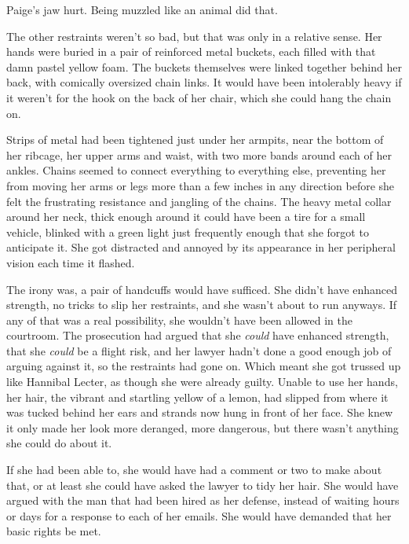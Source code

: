 





Paige's jaw hurt.  Being muzzled like an animal did that.



The other restraints weren't so bad, but that was only in a relative sense.  Her hands were buried in a pair of reinforced metal buckets, each filled with that damn pastel yellow foam.  The buckets themselves were linked together behind her back, with comically oversized chain links.  It would have been intolerably heavy if it weren't for the hook on the back of her chair, which she could hang the chain on.



Strips of metal had been tightened just under her armpits, near the bottom of her ribcage, her upper arms and waist, with two more bands around each of her ankles.  Chains seemed to connect everything to everything else, preventing her from moving her arms or legs more than a few inches in any direction before she felt the frustrating resistance and jangling of the chains.  The heavy metal collar around her neck, thick enough around it could have been a tire for a small vehicle, blinked with a green light just frequently enough that she forgot to anticipate it.  She got distracted and annoyed by its appearance in her peripheral vision each time it flashed.



The irony was, a pair of handcuffs would have sufficed.  She didn't have enhanced strength, no tricks to slip her restraints, and she wasn't about to run anyways.  If any of that was a real possibility, she wouldn't have been allowed in the courtroom.  The prosecution had argued that she \emph{could} have enhanced strength, that she \emph{could} be a flight risk, and her lawyer hadn't done a good enough job of arguing against it, so the restraints had gone on.  Which meant she got trussed up like Hannibal Lecter, as though she were already guilty.  Unable to use her hands, her hair, the vibrant and startling yellow of a lemon, had slipped from where it was tucked behind her ears and strands now hung in front of her face.  She knew it only made her look more deranged, more dangerous, but there wasn't anything she could do about it.



If she had been able to, she would have had a comment or two to make about that, or at least she could have asked the lawyer to tidy her hair.  She would have argued with the man that had been hired as her defense, instead of waiting hours or days for a response to each of her emails.  She would have demanded that her basic rights be met.



